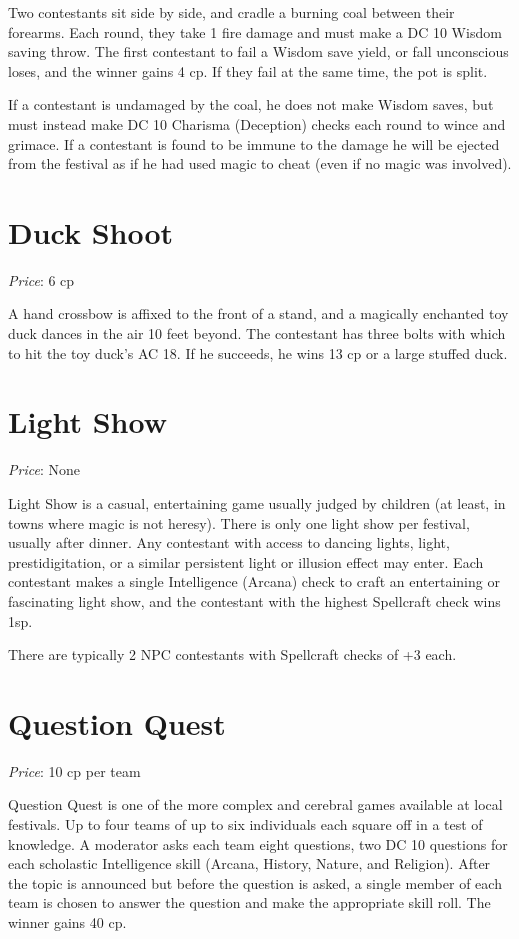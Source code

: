 \documentclass[10pt,a4paper,twoside,bg=print,twocolumn,openany,nodeprecatedcode]{dndbook}
\begin{document}
Two contestants sit side by side, and cradle a burning coal between their forearms. Each round, they take 1 fire damage and must make a DC 10 Wisdom saving throw. The first contestant to fail a Wisdom save yield, or fall unconscious loses, and the winner gains 4 cp. If they fail at the same time, the pot is split.

If a contestant is undamaged by the coal, he does not make Wisdom saves, but must instead make DC 10 Charisma (Deception) checks each round to wince and grimace. If a contestant is found to be immune to the damage he will be ejected from the festival as if he had used magic to cheat (even if no magic was involved).

\section{Duck Shoot}
\textit{Price}: 6 cp

A  hand crossbow is affixed to the front of a stand, and a magically enchanted toy duck dances in the air 10 feet beyond. The contestant has three bolts with which to hit the toy duck's AC 18. If he succeeds, he wins 13 cp or a large stuffed duck.

\section{Light Show}
\textit{Price}: None

Light Show is a casual, entertaining game usually judged by children (at least, in towns where magic is not heresy). There is only one light show per festival, usually after dinner. Any contestant with access  to dancing lights, light, prestidigitation, or a similar persistent light or illusion effect may enter. Each contestant makes a single Intelligence (Arcana) check to craft an entertaining or fascinating light show, and the contestant with the highest Spellcraft check wins 1sp.

There are typically 2 NPC contestants with Spellcraft checks of +3 each.

\section{Question Quest}
\textit{Price}: 10 cp per team

Question Quest is one of the more complex and cerebral games available at local festivals. Up to four teams of up to six individuals each square off in a test of knowledge. A moderator asks each team eight questions, two DC 10 questions for each scholastic Intelligence skill (Arcana, History, Nature, and Religion). After the topic is announced but before the question is asked, a single member of each team is chosen to answer the question and make the appropriate skill roll. The winner gains 40 cp.
\end{document}
